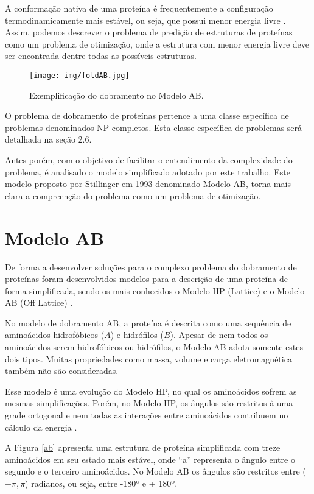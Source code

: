 \documentclass[dm,ppgcomp]{texfurg}
\begin{document}
A conformação nativa de uma proteína é frequentemente a configuração termodinamicamente mais estável, ou seja, que possui menor energia livre \cite{anfinsen1973principles}. Assim, podemos descrever o problema de predição de estruturas de proteínas como um problema de otimização, onde a estrutura com menor energia livre deve ser encontrada dentre todas as possíveis estruturas. 

\begin{figure}[htbp]
  \centering \texttt{[image: img/foldAB.jpg]}
\caption{Exemplificação do dobramento no Modelo AB.} 
\label{abfold}
\end{figure}

O problema de dobramento de proteínas pertence a uma classe específica de problemas denominados NP-completos. Esta classe específica de problemas será detalhada na seção 2.6. 

Antes porém, com o objetivo de facilitar o entendimento da complexidade do problema, é analisado o modelo simplificado adotado por este trabalho. Este modelo proposto por Stillinger \cite{stillinger1993toy} em 1993 denominado Modelo AB, torna mais clara a compreenção do problema como um problema de otimização.

\section{Modelo AB}

De forma a desenvolver soluções para o complexo problema do dobramento de proteínas foram desenvolvidos modelos para a descrição de uma proteína de forma simplificada, sendo os mais conhecidos o Modelo HP (Lattice) \cite{stillinger1993toy} e o Modelo AB (Off Lattice) \cite{zhao2008advances}. 

No modelo de dobramento AB, a proteína é descrita como uma sequência de aminoácidos hidrofóbicos ($A$) e hidrófilos ($B$). Apesar de nem todos os aminoácidos serem hidrofóbicos ou hidrófilos, o Modelo AB adota somente estes dois tipos. Muitas propriedades como massa, volume e carga eletromagnética também não são consideradas. 

Esse modelo é uma evolução do Modelo HP, no qual os aminoácidos sofrem as mesmas simplificações. Porém, no Modelo HP, os ângulos são restritos à uma grade ortogonal e nem todas as interações entre aminoácidos contribuem no cálculo da energia \cite{zhao2008advances}.

A Figura \ref{ab} apresenta uma estrutura de proteína simplificada com treze aminoácidos em seu estado mais estável, onde “a” representa o ângulo entre o segundo e o terceiro aminoácidos. No Modelo AB os ângulos são restritos entre ($-\pi, \pi$) radianos, ou seja, entre -180º e + 180º. 
\end{document}
